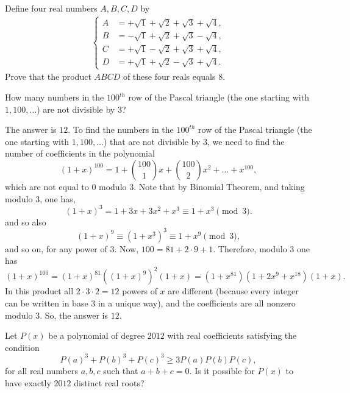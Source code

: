 \begin{question}
Define four real numbers $A,B,C,D$ by
\begin{align*}
    \begin{cases}
        A &= +\sqrt 1+\sqrt 2+\sqrt 3+\sqrt 4,\\
        B &= -\sqrt 1+\sqrt 2+\sqrt 3-\sqrt 4,\\
        C &= +\sqrt 1-\sqrt 2+\sqrt 3+\sqrt 4,\\
        D &= +\sqrt 1+\sqrt 2-\sqrt 3+\sqrt 4.
    \end{cases}
\end{align*}
Prove that the product $ABCD$ of these four reals equals $8$.
\end{question}

\begin{question}
    How many numbers in the $100^{th}$ row of the Pascal triangle (the one starting with $1, 100, \dots$) are not divisible by $3$?
\end{question}

\begin{solution}[name=Solution by Boris]
The answer is $12$. To find the numbers in the $100^{th}$ row of the Pascal triangle (the one starting with $1, 100, \dots$) that are not divisible by $3$, we need to find the number of coefficients in the polynomial
\[ (1+x)^{100}= 1 + {100\choose 1}x + {100\choose 2}x^2 + \dots + x^{100}, \]
which are not equal to $0$ modulo $3$. Note that by Binomial Theorem, and taking modulo $3$, one has,
\[(1+x)^3= 1+ 3x+3x^2+ x^3 \equiv 1+x^3 \pmod 3.\]
and so also
\[(1+x)^9 \equiv (1+x^3)^3 \equiv 1+x^9 \pmod 3,\]
and so on, for any power of $3$. Now, $100= 81+2\cdot 9 + 1$. Therefore, modulo $3$ one has
\[ (1+x)^{100}= (1+x)^{81} \left((1+x)^9\right)^2 (1+x) =
(1+x^{81}) (1+ 2x^{9} + x^{18}) (1+x). \]
In this product all $2\cdot 3 \cdot 2=12 $ powers of $x$ are different (because every integer can be written in base $3$ in a unique way), and the coefficients are all nonzero modulo $3$. So, the answer is $12$.
\end{solution}


\begin{question}[name={2012 Serbia TST}]
    Let $P(x)$ be a polynomial of degree $2012$ with real coefficients satisfying the condition\[P(a)^3 + P(b)^3 + P(c)^3 \geq 3P(a)P(b)P(c),\] for all real numbers $a,b,c$ such that $a+b+c=0$. Is it possible for $P(x)$ to have exactly $2012$ distinct real roots?
\end{question}


